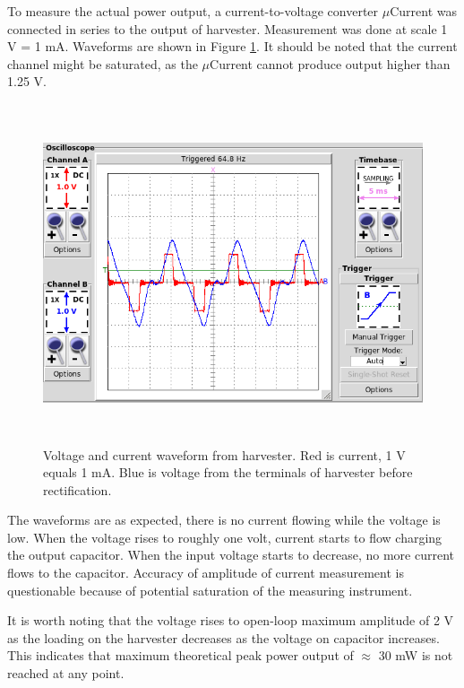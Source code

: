 To measure the actual power output, a current-to-voltage converter $\mu$Current \cite{Jones2010} was connected in series to the output of harvester. Measurement was done at scale 1 V = 1 mA. Waveforms are shown in Figure \ref{fig:inductive_vi_65}. It should be noted that the current channel might be saturated, as the $\mu$Current cannot produce output higher than 1.25 V.

\begin{figure}[htb]
\begin{center}
\includegraphics[height=10cm]{images/own_measurement/generator_shaker/inductive_td_harvesting_vi_65hz_ferro.png}
\end{center}
\caption{\label{fig:inductive_vi_65} Voltage and current waveform from harvester. Red is current, 1 V equals 1 mA. Blue is voltage from the terminals of harvester before rectification.}
\end{figure}

The waveforms are as expected, there is no current flowing while the voltage is low. When the voltage rises to roughly one volt, current starts to flow charging the output capacitor. When the input voltage starts to decrease, no more current flows to the capacitor. Accuracy of amplitude of current measurement is questionable because of potential saturation of the measuring instrument.

It is worth noting that the voltage rises to open-loop maximum amplitude of 2 V as the loading on the harvester decreases as the voltage on capacitor increases. This indicates that maximum theoretical peak power output of $\approx$ 30 mW is not reached at any point. 

